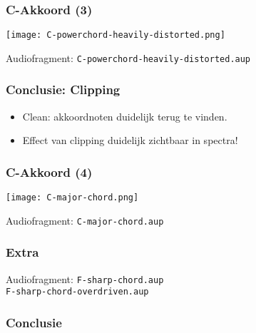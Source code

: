 \documentclass[compress, darktitle, framenumber]{beamer}
\begin{document}
\begin{frame}
\frametitle{C-Akkoord (3)}
\texttt{[image: C-powerchord-heavily-distorted.png]}
\begin{block}{Audiofragment:}
\texttt{C-powerchord-heavily-distorted.aup} 
\end{block}
\end{frame}

\begin{frame}
\frametitle{Conclusie: Clipping}
\begin{itemize}
\item Clean: akkoordnoten duidelijk terug te vinden. 
\item Effect van clipping duidelijk zichtbaar in spectra!
\end{itemize}
\end{frame}

\begin{frame}
\frametitle{C-Akkoord (4)}
\texttt{[image: C-major-chord.png]}
\begin{block}{Audiofragment:}
\texttt{C-major-chord.aup} 
\end{block}
\end{frame}


\begin{frame}
\frametitle{Extra}
\begin{block}{Audiofragment:}
\texttt{F-sharp-chord.aup} \\
\texttt{F-sharp-chord-overdriven.aup} \\
\end{block}
\end{frame}

\begin{frame}
\frametitle{Conclusie}
\end{frame}
\end{document}

